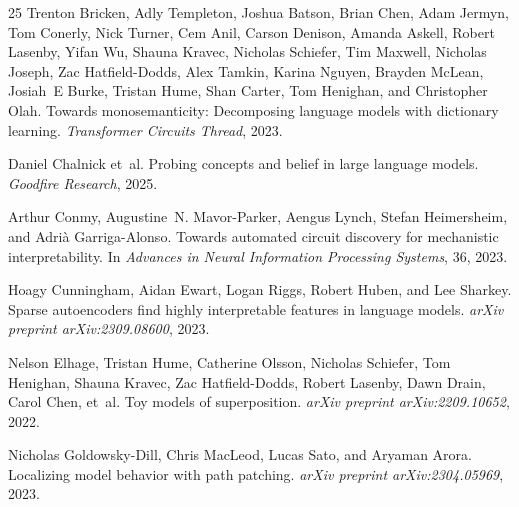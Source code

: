 \documentclass[11pt]{article}
\begin{document}
\begin{thebibliography}{25}
Trenton Bricken, Adly Templeton, Joshua Batson, Brian Chen, Adam Jermyn, Tom
  Conerly, Nick Turner, Cem Anil, Carson Denison, Amanda Askell, Robert
  Lasenby, Yifan Wu, Shauna Kravec, Nicholas Schiefer, Tim Maxwell, Nicholas
  Joseph, Zac Hatfield-Dodds, Alex Tamkin, Karina Nguyen, Brayden McLean,
  Josiah~E Burke, Tristan Hume, Shan Carter, Tom Henighan, and Christopher
  Olah.
\newblock Towards monosemanticity: Decomposing language models with dictionary
  learning.
\newblock \emph{Transformer Circuits Thread}, 2023.

Daniel Chalnick et~al.
\newblock Probing concepts and belief in large language models.
\newblock \emph{Goodfire Research}, 2025.

Arthur Conmy, Augustine~N. Mavor-Parker, Aengus Lynch, Stefan Heimersheim, and
  Adri{\`a} Garriga-Alonso.
\newblock Towards automated circuit discovery for mechanistic interpretability.
\newblock In \emph{Advances in Neural Information Processing Systems}, 36, 2023.

Hoagy Cunningham, Aidan Ewart, Logan Riggs, Robert Huben, and Lee Sharkey.
\newblock Sparse autoencoders find highly interpretable features in language
  models.
\newblock \emph{arXiv preprint arXiv:2309.08600}, 2023.

Nelson Elhage, Tristan Hume, Catherine Olsson, Nicholas Schiefer, Tom Henighan,
  Shauna Kravec, Zac Hatfield-Dodds, Robert Lasenby, Dawn Drain, Carol Chen,
  et~al.
\newblock Toy models of superposition.
\newblock \emph{arXiv preprint arXiv:2209.10652}, 2022.

Nicholas Goldowsky-Dill, Chris MacLeod, Lucas Sato, and Aryaman Arora.
\newblock Localizing model behavior with path patching.
\newblock \emph{arXiv preprint arXiv:2304.05969}, 2023.


\end{thebibliography}
\end{document}

